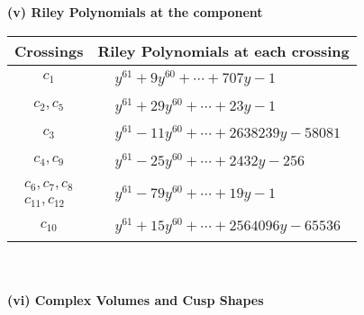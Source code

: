 \documentclass[1p]{elsarticle_modified}
\theoremstyle{definition}
\begin{document}
\newpage\renewcommand{\arraystretch}{1}
\flushleft \textbf{(v) Riley Polynomials at the component}\newline \\
\begin{tabular}{m{50pt}|m{274pt}}
Crossings & \hspace{64pt}Riley Polynomials at each crossing \\
\hline $$\begin{aligned}c_{1}\end{aligned}$$&$\begin{aligned}
&y^{61}+9 y^{60}+\cdots+707 y-1
\end{aligned}$\\
\hline $$\begin{aligned}c_{2},c_{5}\end{aligned}$$&$\begin{aligned}
&y^{61}+29 y^{60}+\cdots+23 y-1
\end{aligned}$\\
\hline $$\begin{aligned}c_{3}\end{aligned}$$&$\begin{aligned}
&y^{61}-11 y^{60}+\cdots+2638239 y-58081
\end{aligned}$\\
\hline $$\begin{aligned}c_{4},c_{9}\end{aligned}$$&$\begin{aligned}
&y^{61}-25 y^{60}+\cdots+2432 y-256
\end{aligned}$\\
\hline $$\begin{aligned}c_{6},c_{7},c_{8}\\c_{11},c_{12}\end{aligned}$$&$\begin{aligned}
&y^{61}-79 y^{60}+\cdots+19 y-1
\end{aligned}$\\
\hline $$\begin{aligned}c_{10}\end{aligned}$$&$\begin{aligned}
&y^{61}+15 y^{60}+\cdots+2564096 y-65536
\end{aligned}$\\
\hline
\end{tabular}\\~\\
\newpage\flushleft \textbf{(vi) Complex Volumes and Cusp Shapes}
\end{document}
